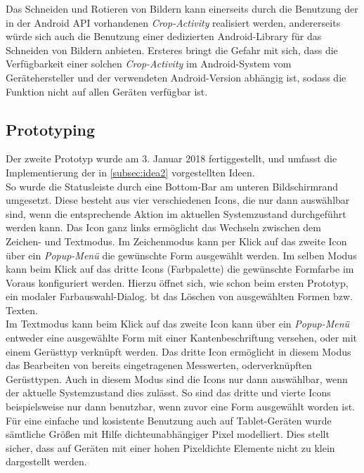 Das Schneiden und Rotieren von Bildern kann einerseits durch die Benutzung der in der Android API vorhandenen \emph{Crop-Activity} realisiert werden, andererseits würde sich auch die Benutzung einer dedizierten Android-Library für das Schneiden von Bildern anbieten.
Ersteres bringt die Gefahr mit sich, dass die Verfügbarkeit einer solchen \emph{Crop-Activity} im Android-System vom Gerätehersteller und der verwendeten Android-Version abhängig ist, sodass die Funktion nicht auf allen Geräten verfügbar ist. 

\subsection{Prototyping}
Der zweite Prototyp wurde am 3. Januar 2018 fertiggestellt, und umfasst die Implementierung der in \autoref{subsec:idea2} vorgestellten Ideen. \\

So wurde die Statusleiste durch eine Bottom-Bar am unteren Bildschirmrand umgesetzt.
Diese besteht aus vier verschiedenen Icons, die nur dann auswählbar sind, wenn die entsprechende Aktion im aktuellen Systemzustand durchgeführt werden kann.
Das Icon ganz links ermöglicht das Wechseln zwischen dem Zeichen- und Textmodus.
Im Zeichenmodus kann per Klick auf das zweite Icon über ein \emph{Popup-Menü} die gewünschte Form ausgewählt werden.
Im selben Modus kann beim Klick auf das dritte Icons (Farbpalette) die gewünschte Formfarbe im Voraus konfiguriert werden. Hierzu öffnet sich, wie schon beim ersten Prototyp, ein modaler Farbauswahl-Dialog.
bt das Löschen von ausgewählten Formen bzw. Texten. \\

Im Textmodus kann beim Klick auf das zweite Icon kann über ein \emph{Popup-Menü} entweder eine ausgewählte Form mit einer Kantenbeschriftung versehen, oder mit einem Gerüsttyp verknüpft werden.
Das dritte Icon ermöglicht in diesem Modus das Bearbeiten von bereits eingetragenen Messwerten, oderverknüpften Gerüsttypen.
Auch in diesem Modus sind die Icons nur dann auswählbar, wenn der aktuelle Systemzustand dies zulässt.
So sind das dritte und vierte Icons beispielsweise nur dann benutzbar, wenn zuvor eine Form ausgewählt worden ist. \\

Für eine einfache und kosistente Benutzung auch auf Tablet-Geräten wurde sämtliche Größen mit Hilfe dichteunabhängiger Pixel modelliert. Dies stellt sicher, dass auf Geräten mit einer hohen Pixeldichte Elemente nicht zu klein dargestellt werden.

